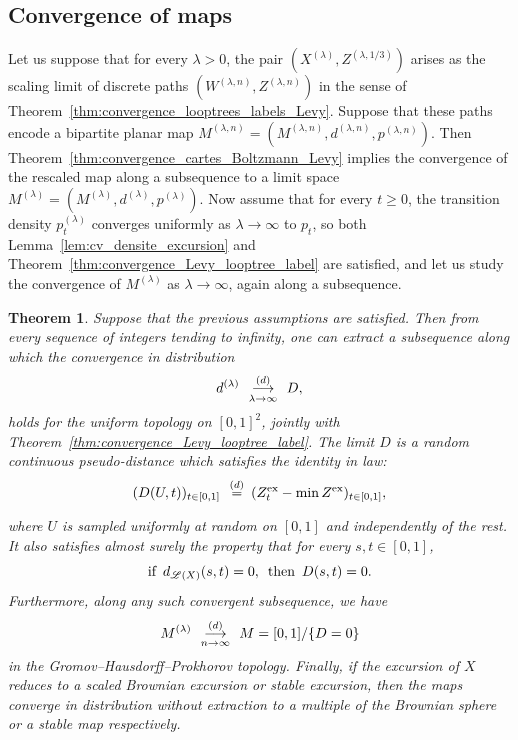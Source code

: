 \documentclass[british, a4paper,11pt]{article}
\numberwithin{equation}{section}
\newtheorem{thm}{\bfseries \upshape Theorem}[section]
\theoremstyle{definition}
\newcommand{\Loop}{\mathscr{L}}
\newcommand{\Map}{M}
\newcommand{\cvloi}[1][n]{\enskip\mathop{\longrightarrow}^{(d)}_{#1 \to \infty}\enskip}
\newcommand{\eqloi}[1][n]{\enskip\mathop{=}^{(d)}_{}\enskip}
\newcommand{\exc}{\mathrm{ex}}
\begin{document}
\subsection{Convergence of maps}
\label{ssec:convergence_cartes_Levy}

Let us suppose that for every $\lambda>0$, the pair $(X^{(\lambda)}, Z^{(\lambda, 1/3)})$ arises as the scaling limit of discrete paths $(W^{(\lambda, n)}, Z^{(\lambda, n)})$ in the sense of Theorem~\ref{thm:convergence_looptrees_labels_Levy}. Suppose that these paths encode a bipartite planar map $\Map^{(\lambda, n)} = (\Map^{(\lambda, n)}, d^{(\lambda, n)}, p^{(\lambda, n)})$. Then Theorem~\ref{thm:convergence_cartes_Boltzmann_Levy} implies the convergence of the rescaled map along a subsequence to a limit space $\Map^{(\lambda)} = (\Map^{(\lambda)}, d^{(\lambda)}, p^{(\lambda)})$.
Now assume that for every $t \geq 0$, the transition density $p^{(\lambda)}_t$ converges uniformly as $\lambda \to \infty$ to $p_t$, so both Lemma~\ref{lem:cv_densite_excursion} and Theorem~\ref{thm:convergence_Levy_looptree_label} are satisfied, and let us study the convergence of $\Map^{(\lambda)}$ as $\lambda\to\infty$, again along a subsequence.

\begin{thm}\label{thm:convergence_Levy_cartes}
Suppose that the previous assumptions are satisfied.
Then from every sequence of integers tending to infinity, one can extract a subsequence along which the convergence in distribution
\[d^{(\lambda)} \cvloi[\lambda] D,\]
holds for the uniform topology on $[0,1]^2$, jointly with Theorem~\ref{thm:convergence_Levy_looptree_label}.
The limit $D$ is a random continuous pseudo-distance which satisfies the identity in law:
\[(D(U,t))_{t \in [0,1]} \eqloi (Z^{\exc}_t - \min Z^{\exc})_{t \in [0,1]},\]
where $U$ is sampled uniformly at random on $[0,1]$ and independently of the rest.
It also satisfies almost surely the property that for every $s,t \in [0,1]$, 
\[\text{if}\enskip d_{\Loop(X)}(s,t) = 0, \enskip\text{then}\enskip D(s,t) = 0.\]
Furthermore, along any such convergent subsequence, we have
\[\Map^{(\lambda)} \cvloi{} \Map = [0,1]/\{D=0\}\]
in the Gromov--Hausdorff--Prokhorov topology. 
Finally, if the excursion of $X$ reduces to a scaled Brownian excursion or stable excursion, then the maps converge in distribution without extraction to a multiple of the Brownian sphere or a stable map respectively.
\end{thm}
\end{document}
